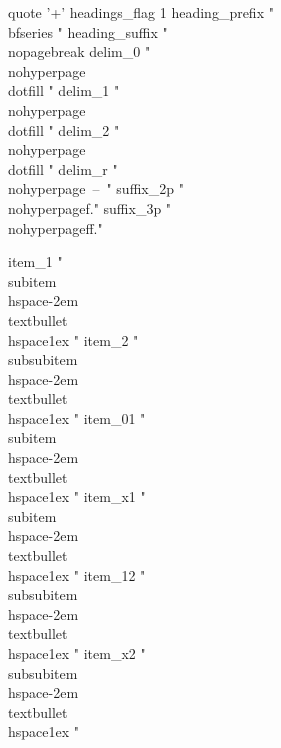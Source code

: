 quote '+' %
headings_flag 1
heading_prefix "{\\bfseries "
heading_suffix "}\\nopagebreak%
delim_0 "\\nohyperpage{\\dotfill }"
delim_1 "\\nohyperpage{\\dotfill }"
delim_2 "\\nohyperpage{\\dotfill }"
delim_r "\\nohyperpage{~--~}"
suffix_2p "\\nohyperpage{f.}"
suffix_3p "\\nohyperpage{ff.}"



item_1 "\n \\subitem\\hspace{-2em}\\textbullet \\hspace{1ex} "
item_2 "\n \\subsubitem\\hspace{-2em}\\textbullet \\hspace{1ex} "
item_01 "\n \\subitem\\hspace{-2em}\\textbullet \\hspace{1ex} "
item_x1 "\n \\subitem\\hspace{-2em}\\textbullet \\hspace{1ex} "
item_12 "\n \\subsubitem\\hspace{-2em}\\textbullet \\hspace{1ex} "
item_x2 "\n \\subsubitem\\hspace{-2em}\\textbullet \\hspace{1ex} "
